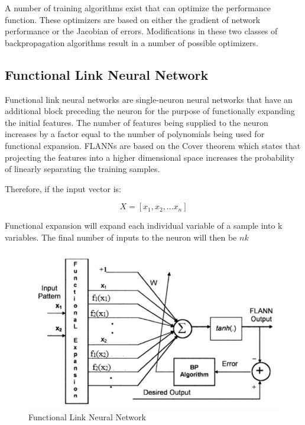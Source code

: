 \documentclass[]{article}
\begin{document}
A number of training algorithms exist that can optimize the performance function. These optimizers are based on either the gradient of network performance or the Jacobian of errors. Modifications in these two classes of backpropagation algorithms result in a number of possible optimizers.

\hypertarget{functional-link-neural-network}{%
\subsection{Functional Link Neural Network}\label{functional-link-neural-network}}

Functional link neural networks are single-neuron neural networks that have an additional block preceding the neuron for the purpose of functionally expanding the initial features. The number of features being supplied to the neuron increases by a factor equal to the number of polynomials being used for functional expansion. FLANNs are based on the Cover theorem which states that projecting the features into a higher dimensional space increases the probability of linearly separating the training samples.

Therefore, if the input vector is:

\begin{equation}
X = [x_1, x_2, \ldots x_n] \label{eq:vectoreq}
\end{equation}

Functional expansion will expand each individual variable of a sample into k variables. The final number of inputs to the neuron will then be \(nk\)

\begin{figure}
\centering
\includegraphics[width=1\textwidth,height=\textheight]{images/flann.jpg}
\caption{Functional Link Neural Network \label{fig:flann}}
\end{figure}
\end{document}
